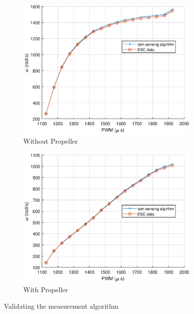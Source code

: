 \begin{figure}[H]
    \begin{minipage}{0.49\textwidth}
        \begin{figure}[H]
            \centering
            \includegraphics[width = \textwidth]{./figs/rpm_feedback/rpm_meas_noprop.eps}
            \caption*{Without Propeller}
        \end{figure}
    \end{minipage}
    \begin{minipage}{0.49\textwidth}
        \begin{figure}[H]
            \centering
            \includegraphics[width = \textwidth]{./figs/rpm_feedback/rpm_meas_prop.eps}
            \caption*{With Propeller}
        \end{figure}
    \end{minipage}
    \caption{Validating the measurement algorithm}
\end{figure}
